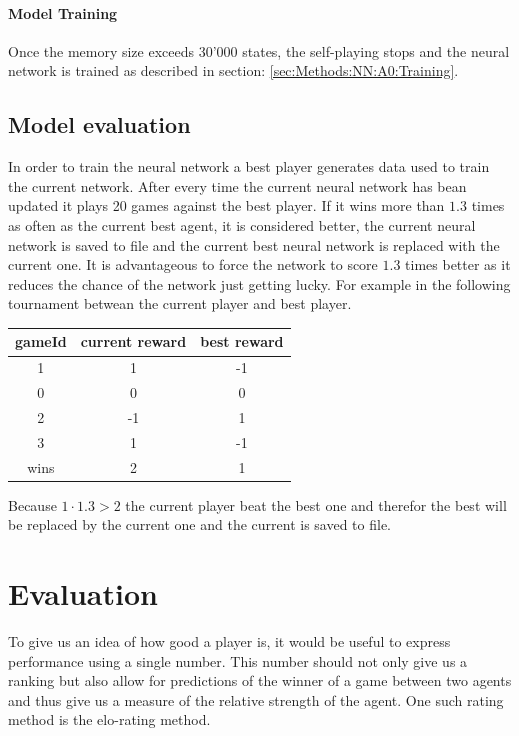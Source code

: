 \documentclass[12pt]{article}
\begin{document}
\paragraph{Model Training}
Once the memory size exceeds 30'000 states, the self-playing stops and the neural network is trained as described in section:  \ref{sec:Methods:NN:A0:Training}.

\subsection{Model evaluation}
In order to train the neural network a best player generates data used to train the current network.
After every time the current neural network has bean updated it plays 20 games against the best player. If it wins more than \(1.3\) times as often as the current best agent, it is considered better, the current neural network is saved to file and the current best neural network is replaced with the current one. It is advantageous to force the network to score \(1.3\) times better as it reduces the chance of the network just getting lucky. For example in the following tournament betwean the current player and best player.
\\
\begin{center}\begin{tabular}{|c|c|c|}
\hline
gameId & current reward & best reward\\\hline
1 & 1 & -1\\
0 & 0 & 0 \\
2 & -1& 1 \\
3 & 1 & -1\\\hline
wins & 2 & 1 \\\hline
\end{tabular}\end{center}
Because \(1 \cdot 1.3 > 2\) the current player beat the best one and therefor the best will be replaced by the current one and the current is saved to file.

\section{Evaluation}
To give us an idea of how good a player is, it would be useful to express performance using a single number. This number should not only give us a ranking but also allow for predictions of the winner of a game between two agents and thus give us a measure of the relative strength of the agent. One such rating method is the elo-rating method. \cite{elo1978rating}
\end{document}
